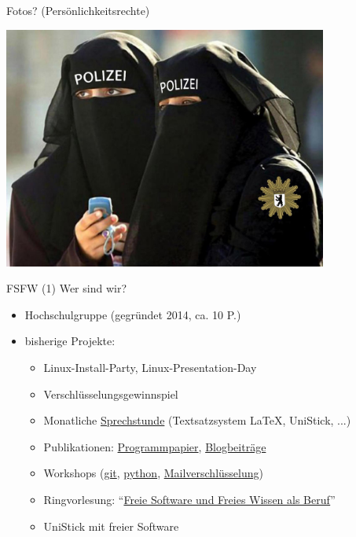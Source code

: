 \documentclass[t]{beamer}
\begin{document}

\begin{frame}[label=photo,plain]{\color{fg}Fotos? (Persönlichkeitsrechte)}
\vspace{10mm}
\begin{center}
\includegraphics[width=0.8\textwidth]{img-src/annonymitaet}

\end{center}

\end{frame}



\begin{frame}[label=ct1]{\color{fg}FSFW (1)}
Wer sind wir?
  \begin{itemize}
  \item Hochschulgruppe (gegründet 2014, ca. 10 P.)
  \item bisherige Projekte:
  \begin{itemize}
   \item Linux-Install-Party, Linux-Presentation-Day
   \item Verschlüsselungsgewinnspiel
   \item Monatliche \href{https://fsfw-dresden.de/sprechstunde}{Sprechstunde} (Textsatzsystem \LaTeX, UniStick, ...)
   \item Publikationen: \href{https://fsfw-dresden.de/programm}{Programmpapier}, \href{https://fsfw-dresden.de/blog}{Blogbeiträge}
   \item Workshops (\href{https://fsfw-dresden.de/git-ws}{git}, \href{https://fsfw-dresden.de/python-workshop}{python},
   \href{https://fsfw-dresden.de/gpg}{Mailverschlüsselung})
   \item Ringvorlesung: "`\href{https://fsfw-dresden.de/ringvorlesung}{Freie Software und Freies Wissen als Beruf}"'
   \smallskip
   \item UniStick mit freier Software
  \end{itemize}
  \end{itemize}
\end{frame}
\end{document}
